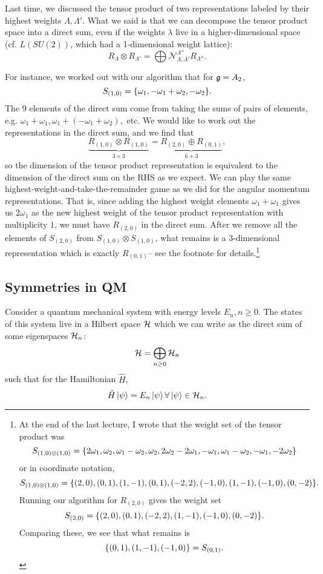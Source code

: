 Last time, we discussed the tensor product of two representations labeled by their highest weights $\Lambda,\Lambda'$. What we said is that we can decompose the tensor product space into a direct sum, even if the weights $\lambda$ live in a higher-dimensional space (cf. $L(SU(2))$, which had a 1-dimensional weight lattice):
$$R_\Lambda \otimes R_{\Lambda'} =\bigoplus \mathcal{N}_{\Lambda,\Lambda'}^{\Lambda''}R_{\Lambda''}.$$

For instance, we worked out with our algorithm that for $\mathfrak{g}=A_2$,
$$S_{(1,0)}=\{\omega_1,-\omega_1+\omega_2,-\omega_2\}.$$
The 9 elements of the direct sum come from taking the sums of pairs of elements, e.g. $\omega_1+\omega_1, \omega_1+(-\omega_1+\omega_2),$ etc. We would like to work out the representations in the direct sum, and we find that
$$\underbrace{R_{(1,0)}\otimes R_{(1,0)}}_{3\times 3}=\underbrace{R_{(2,0)}\oplus R_{(0,1)}}_{6+3},$$
so the dimension of the tensor product representation is equivalent to the dimension of the direct sum on the RHS as we expect.
We can play the same highest-weight-and-take-the-remainder game as we did for the angular momentum representations. That is, since adding the highest weight elements $\omega_1+\omega_1$ gives us $2\omega_1$ as the new highest weight of the tensor product representation with multiplicity $1$, we must have $R_{(2,0)}$ in the direct sum. After we remove all the elements of $S_{(2,0)}$ from $S_{(1,0)}\otimes S_{(1,0)}$, what remains is a $3$-dimensional representation which is exactly $R_{(0,1)}$-- see the footnote for details.\footnote{At the end of the last lecture, I wrote that the weight set of the tensor product was $$S_{(1,0)\otimes (1,0)}=\{2\omega_1,\omega_2,\omega_1-\omega_2,\omega_2,2\omega_2-2\omega_1,-\omega_1,\omega_1-\omega_2,-\omega_1,-2\omega_2\}$$
or in coordinate notation,
$$S_{(1,0)\otimes (1,0)}=\{(2,0),(0,1),(1,-1),(0,1),(-2,2),(-1,0),(1,-1),(-1,0),(0,-2)\}.$$
Running our algorithm for $R_{(2,0)}$ gives the weight set $$S_{(2,0)}=\{(2,0),(0,1),(-2,2),(1,-1),(-1,0),(0,-2)\}.$$
Comparing these, we see that what remains is
$$\{(0,1),(1,-1),(-1,0)\}=S_{(0,1)}.$$}

\subsection*{Symmetries in QM} Consider a quantum mechanical system with energy levels $E_n,n\geq 0$. The states of this system live in a Hilbert space $\mathcal H$  which we can write as the direct sum of some eigenspaces $\mathcal H_n$:
$$\mathcal H=\bigoplus_{n\geq 0} \mathcal H_n$$
such that for the Hamiltonian $\hat H$,
$$\hat H\left| \psi \right>=E_n \left| \psi \right>\forall \left| \psi \right>\in \mathcal H_n.$$

